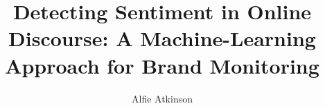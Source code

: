 \author{Alfie Atkinson}

\title{\bfseries Detecting Sentiment in Online Discourse: A Machine-Learning Approach for Brand Monitoring}



